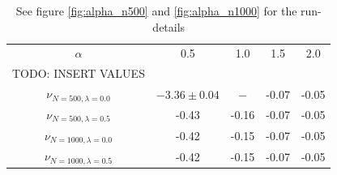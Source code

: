 \documentclass[a4paper,11pt]{article}
\begin{document}
{\begin{table}[h]
\caption{See figure \ref{fig:alpha_n500} and \ref{fig:alpha_n1000} for the run-details}
\begin{center}
\begin{tabular}{c|c|c|c|c}
$\alpha$ & 0.5 & 1.0 & 1.5 & 2.0 \\
TODO: INSERT VALUES \\
$\nu_{N=500, \lambda=0.0}$ & $-3.36\pm0.04$ & $-$ & -0.07 & -0.05 \\
$\nu_{N=500, \lambda=0.5}$ & -0.43 & -0.16 & -0.07 & -0.05 \\
$\nu_{N=1000, \lambda=0.0}$ & -0.42 & -0.15 & -0.07 & -0.05 \\
$\nu_{N=1000, \lambda=0.5}$ & -0.42 & -0.15 & -0.07 & -0.05 
\end{tabular}
\end{center}
\label{tab:closepartner}
\end{table}%







}
\end{document}
